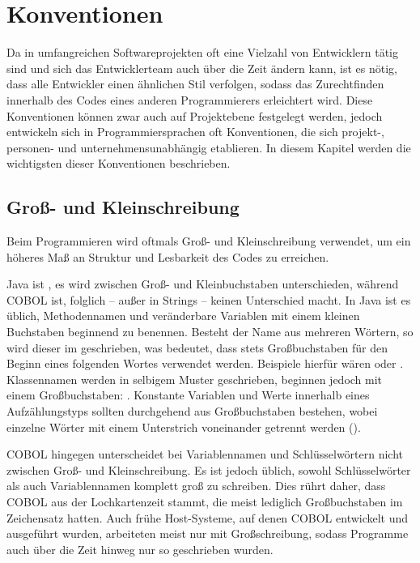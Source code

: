 \section{Konventionen}
Da in umfangreichen Softwareprojekten oft eine Vielzahl von Entwicklern tätig sind und sich das Entwicklerteam auch über die Zeit ändern kann, ist es nötig, dass alle Entwickler einen ähnlichen Stil verfolgen, sodass das Zurechtfinden innerhalb des Codes eines anderen Programmierers erleichtert wird. Diese Konventionen können zwar auch auf Projektebene festgelegt werden, jedoch entwickeln sich in Programmiersprachen oft Konventionen, die sich projekt-, personen- und unternehmensunabhängig etablieren. In diesem Kapitel werden die wichtigsten dieser Konventionen beschrieben.

\subsection*{Groß- und Kleinschreibung}
Beim Programmieren wird oftmals Groß- und Kleinschreibung verwendet, um ein höheres Maß an Struktur und Lesbarkeit des Codes zu erreichen.

Java ist , \dahe  es wird zwischen Groß- und Kleinbuchstaben unterschieden, während COBOL  ist, folglich -- außer in Strings -- keinen Unterschied macht. In Java ist es üblich, Methodennamen und veränderbare Variablen mit einem kleinen Buchstaben beginnend zu benennen. Besteht der Name aus mehreren Wörtern, so wird dieser im  geschrieben, was bedeutet, dass stets Großbuchstaben für den Beginn eines folgenden Wortes verwendet werden. Beispiele hierfür wären  oder . Klassennamen werden in selbigem Muster geschrieben, beginnen jedoch mit einem Großbuchstaben: . Konstante Variablen und Werte innerhalb eines Aufzählungstyps sollten durchgehend aus Großbuchstaben bestehen, wobei einzelne Wörter mit einem Unterstrich voneinander getrennt werden (). 

COBOL hingegen unterscheidet bei Variablennamen und Schlüsselwörtern nicht zwischen Groß- und Kleinschreibung. Es ist jedoch üblich, sowohl Schlüsselwörter als auch Variablennamen komplett groß zu schreiben. Dies rührt daher, dass COBOL aus der Lochkartenzeit stammt, die meist lediglich Großbuchstaben im Zeichensatz hatten. Auch frühe Host-Systeme, auf denen COBOL entwickelt und ausgeführt wurden, arbeiteten meist nur mit Großschreibung, sodass Programme auch über die Zeit hinweg nur so geschrieben wurden.


